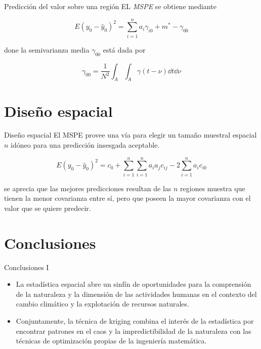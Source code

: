 \documentclass[12pts]{beamer}
\begin{document}
	\begin{frame}{Predicción del valor sobre una región}
		EL \textit{MSPE} se obtiene mediante
		
		\begin{equation}
		E\left(y_0 - \hat{y}_0\right)^2 = \sum_{i=1}^{n} a_i \gamma_{i0} + m^* - \gamma_{00}
		\end{equation}
		
		\noindent done la semivarianza media $\gamma_{00}$ está dada por
		
		\begin{equation}
		\gamma_{00} = \frac{1}{N^2} \int_{A}\int_{A}\gamma(t-\nu)\dd{t}\dd{\nu}
		\end{equation}
	\end{frame}

	\section{Diseño espacial}
	\begin{frame}{Diseño espacial}
		El MSPE provee una vía para elegir un tamaño muestral espacial $n$ idóneo para una predicción insesgada aceptable. 
		
		$$E\left(y_0 - \hat{y}_0\right)^2 = c_0 + \sum_{i=1}^{n}\sum_{i=1}^{n}a_i a_j c_{ij} -2 \sum_{i=1}^{n}a_i c_{i0}$$
		
		\noindent se aprecia que las mejores predicciones resultan de las $n$ regiones muestra que tienen la menor covarianza entre sí, pero que poseen la mayor covarianza con el valor que se quiere predecir. 		
	\end{frame}

	\section{Conclusiones}
	\begin{frame}{Conclusiones I}
		\begin{itemize}
			\item La estadística espacial abre un sinfín de oportunidades para la comprensión de la naturaleza y la dimensión de las actividades humanas en el contexto del cambio climático y la explotación de recursos naturales.
			\item Conjuntamente, la técnica de kriging combina el interés de la estadística por encontrar patrones en el caos y la impredictibilidad de la naturaleza con las técnicas de optimización propias de la ingeniería matemática. 
		\end{itemize}
	\end{frame}
\end{document}
